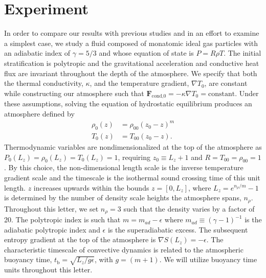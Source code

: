 \documentclass[aps, prl, twocolumn, nofootinbib, groupedaddress, amsfonts, amssymb, amsmath]{revtex4-1}
\newcommand{\grad}{\ensuremath{\nabla}}
\begin{document}
\section{Experiment} 
\label{sec:experiment}
In order to compare our results with previous studies and in an effort to examine a simplest case,
we study a fluid composed of monatomic ideal gas particles with an adiabatic index of $\gamma = 5/3$ and
whose equation of state is $P = R\rho T$. 
The initial stratification is polytropic and the gravitational
acceleration and conductive heat flux are invariant throughout the depth of the atmosphere. We specify that both 
the thermal conductivity, $\kappa$, and the temperature gradient, $\grad T_0$, are constant while constructing
our atmosphere such that $\bm{F}_{\text{cond,0}} = -\kappa \grad T_0 = \text{constant}$.
Under these assumptions, solving the equation of hydrostatic equilibrium produces an atmosphere defined by
\begin{equation}
\begin{split}
\rho_0(z) &= \rho_{00}(z_0 - z)^m \\
T_0(z)    &= T_{00}(z_0 - z).
\label{eqn:polytrope}
\end{split}
\end{equation}
Thermodynamic variables are nondimensionalized at the top of the atmosphere as 
$P_0(L_z) = \rho_0(L_z) = T_0(L_z) = 1$, requiring $z_0 \equiv L_z + 1$ and $R = T_{00} = \rho_{00} = 1$.
By this choice, the non-dimensional length scale is the inverse temperature gradient scale and
the timescale is the isothermal sound crossing time of this unit length.
$z$ increases upwards within the bounds $z =[0, L_{z}]$, where $L_{z} = e^{n_{\rho}/m} - 1$ is
determined by the number of density scale heights the atmosphere spans, $n_\rho$.
Throughout this letter, we set $n_{\rho} = 3$ such that the density varies by a factor of 20.
The polytropic index is such that $m = m_{ad} - \epsilon$
where $m_{ad} \equiv (\gamma-1)^{-1}$ is the adiabatic polytropic index and $\epsilon$ is the
superadiabatic excess.
The subsequent entropy gradient at the top of the atmosphere is $\grad S(L_z) = -\epsilon$.  
The characteristic timescale of convective dynamics
is related to the atmospheric buoyancy time, $t_{\text{b}} = \sqrt{L_z/g\epsilon}$, with $g = (m+1)$.
We will utilize buoyancy time units throughout this letter.
\end{document}

